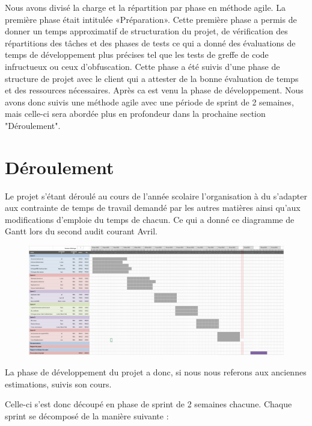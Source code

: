 Nous avons divisé la charge et la répartition par phase en méthode agile. La première phase était intitulée
«Préparation». Cette première phase a permis de donner un temps approximatif de structuration du
projet, de vérification des répartitions des tâches et des phases de tests ce qui a donné des
évaluations de temps de développement plus précises tel que les tests de greffe de code infructueux ou ceux
d'obfuscation. Cette phase a été suivis d'une phase de structure de projet avec le client qui a attester de la bonne évaluation de temps
et des ressources nécessaires. Après ca est venu la phase de développement. Nous avons donc suivis une méthode agile avec une période de sprint de 2 semaines, mais
celle-ci sera abordée plus en profondeur dans la prochaine section "Déroulement".\newline

\newpage

\section{Déroulement}

Le projet s'étant déroulé au cours de l'année scolaire l'organisation à du s'adapter aux
contrainte de temps de travail demandé par les autres matières ainsi qu'aux modifications d'emploie
du temps de chacun. Ce qui a donné ce diagramme de Gantt lors du second audit courant Avril.

\begin{figure}[!h]
	\centering
	\includegraphics[width=15cm]{Gantt.png}
\end{figure}

La phase de développement du projet a donc, si nous nous referons aux anciennes estimations, suivis son cours.\newline

Celle-ci s'est donc découpé en phase de sprint de 2 semaines chacune. Chaque sprint se décomposé de la manière suivante :\newline  

